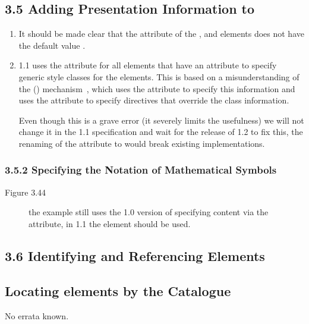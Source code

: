 \subsection*{3.5 Adding Presentation Information to \else{\omdoc}\fi}
\begin{enumerate}
\item It should be made clear that the {} attribute of the
  {}, {} and {} elements does not have the default
  value {}.
\item {\omdoc}1.1 uses the {} attribute for all elements that
  have an {} attribute to specify generic style classes for the
  {\omdoc} elements.  This is based on a misunderstanding of the {\xml}
  {} ({\css}) mechanism~\cite{BosHak:css98}, which
  uses the {} attribute to specify this information and uses the
  {} attribute to specify {\css} directives that override the class
  information. 
  
  {\sf Even though this is a grave error (it severely limits the usefulness) we
    will not change it in the {\omdoc} 1.1 specification and wait for the release
    of {\omdoc} 1.2 to fix this, the renaming of the {}
    attribute to {} would break existing implementations.}
\end{enumerate}

\subsubsection{3.5.2 Specifying the Notation of Mathematical Symbols}
\begin{description}
\item[Figure 3.44] the example still uses the {\omdoc}1.0 version of specifying
  {\xslt} content via the {} attribute, in {\omdoc}1.1 the
  element {} should be used. 
\end{description}


\subsection*{3.6 Identifying and Referencing {\else{\omdoc}\fi} Elements}

\subsection*{Locating {\fi} elements by the {\else{\omdoc}\fi} Catalogue}
No errata known.


